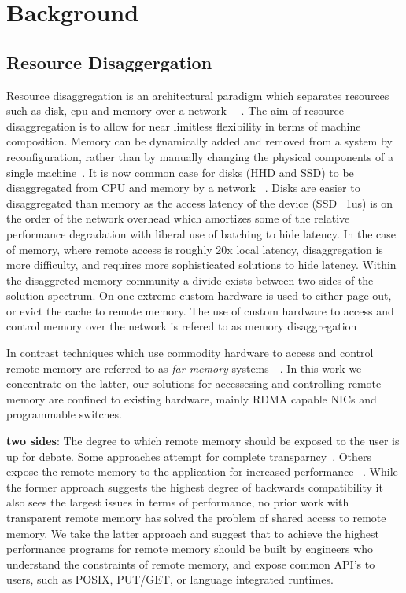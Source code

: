 \section{Background}


\subsection{Resource Disaggergation}

Resource disaggregation is an architectural paradigm which separates resources
such as disk, cpu and memory over a network ~\cite{requirements}~\cite{legoos}. The aim of resource disaggregation is to allow
for near limitless flexibility in terms of machine composition. Memory can be
dynamically added and removed from a system by reconfiguration, rather than by
manually changing the physical components of a single machine~\cite{fastswap}.
It is now common case for disks (HHD and SSD) to be disaggregated from CPU and
memory by a network ~\cite{decible}. Disks are easier to disaggregated than
memory as the access latency of the device (SSD ~1us) is on the order of the
network overhead which amortizes some of the relative performance degradation
with liberal use of batching to hide latency. In the case of memory, where
remote access is roughly 20x local latency, disaggregation is more difficulty,
and requires more sophisticated solutions to hide latency. Within the
disaggreted memory community a divide exists between two sides of the solution
spectrum. On one extreme custom hardware is used to either page out, or evict
the cache to remote memory. The use of custom hardware to access and control
memory over the network is refered to as memory disaggregation


In contrast techniques which use commodity hardware to access and control remote
memory are referred to as \textit{far memory} systems~\cite{legoos, reigons,
clover}~. In this work we concentrate on the latter, our solutions
for accessesing and controlling remote memory are confined to existing hardware,
mainly RDMA capable NICs and programmable switches.

\textbf{two sides}: The degree to which remote memory should be exposed to the
user is up for debate. Some approaches attempt for complete
transparncy~\cite{fastswap,GMS,leap,infiniswap}. Others
expose the remote memory to the application for increased performance
~\cite{reigons, aifm}. While the former approach suggests the highest
degree of backwards compatibility it also sees the largest issues in terms of
performance, no prior work with transparent remote memory has solved the problem
of shared access to remote memory. We take the latter approach and suggest that
to achieve the highest performance programs for remote memory should be built by
engineers who understand the constraints of remote memory, and expose common
API's to users, such as POSIX, PUT/GET, or language integrated
runtimes\todo{\\cite}.

